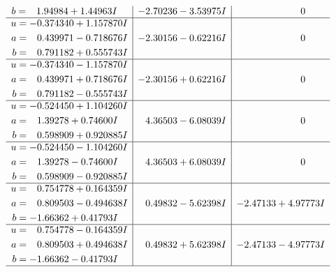 \documentclass[1p]{elsarticle_modified}
\theoremstyle{definition}
\begin{document}
$$\begin{array}{c|c|c}
\begin{aligned}
b &= \phantom{-}1.94984 + 1.44963 I\end{aligned}
 & -2.70236 - 3.53975 I & \phantom{-0.000000 } 0 \\ \hline\begin{aligned}
u &= -0.374340 + 1.157870 I \\
a &= \phantom{-}0.439971 - 0.718676 I \\
b &= \phantom{-}0.791182 + 0.555743 I\end{aligned}
 & -2.30156 - 0.62216 I & \phantom{-0.000000 } 0 \\ \hline\begin{aligned}
u &= -0.374340 - 1.157870 I \\
a &= \phantom{-}0.439971 + 0.718676 I \\
b &= \phantom{-}0.791182 - 0.555743 I\end{aligned}
 & -2.30156 + 0.62216 I & \phantom{-0.000000 } 0 \\ \hline\begin{aligned}
u &= -0.524450 + 1.104260 I \\
a &= \phantom{-}1.39278 + 0.74600 I \\
b &= \phantom{-}0.598909 + 0.920885 I\end{aligned}
 & \phantom{-}4.36503 - 6.08039 I & \phantom{-0.000000 } 0 \\ \hline\begin{aligned}
u &= -0.524450 - 1.104260 I \\
a &= \phantom{-}1.39278 - 0.74600 I \\
b &= \phantom{-}0.598909 - 0.920885 I\end{aligned}
 & \phantom{-}4.36503 + 6.08039 I & \phantom{-0.000000 } 0 \\ \hline\begin{aligned}
u &= \phantom{-}0.754778 + 0.164359 I \\
a &= \phantom{-}0.809503 - 0.494638 I \\
b &= -1.66362 + 0.41793 I\end{aligned}
 & \phantom{-}0.49832 - 5.62398 I & -2.47133 + 4.97773 I \\ \hline\begin{aligned}
u &= \phantom{-}0.754778 - 0.164359 I \\
a &= \phantom{-}0.809503 + 0.494638 I \\
b &= -1.66362 - 0.41793 I\end{aligned}
 & \phantom{-}0.49832 + 5.62398 I & -2.47133 - 4.97773 I\\
 \hline 
 \end{array}$$\newpage$$\begin{array}{c|c|c}  

\end{array}$$
\end{document}
